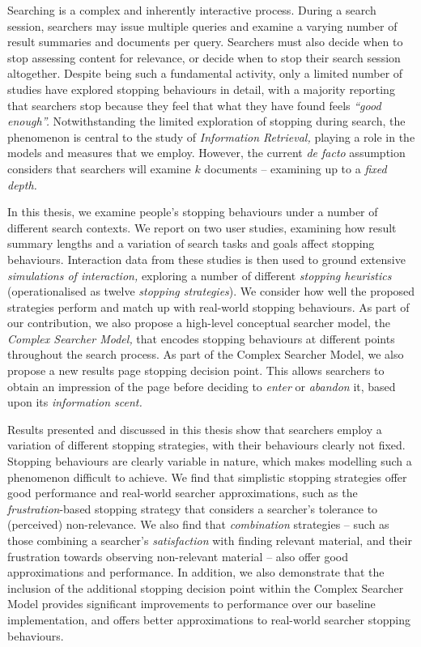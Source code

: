 
\begin{preamble}
{}

Searching is a complex and inherently interactive process. During a search session, searchers may issue multiple queries and examine a varying number of result summaries and documents per query. Searchers must also decide when to stop assessing content for relevance, or decide when to stop their search session altogether. Despite being such a fundamental activity, only a limited number of studies have explored stopping behaviours in detail, with a majority reporting that searchers stop because they feel that what they have found feels \emph{``good enough''.} Notwithstanding the limited exploration of stopping during search, the phenomenon is central to the study of \emph{Information Retrieval,} playing a role in the models and measures that we employ. However, the current \emph{de facto} assumption considers that searchers will examine $k$ documents -- examining up to a \emph{fixed depth.}

In this thesis, we examine people's stopping behaviours under a number of different search contexts. We report on two user studies, examining how result summary lengths and a variation of search tasks and goals affect stopping behaviours. Interaction data from these studies is then used to ground extensive \emph{simulations of interaction,}  exploring a number of different \emph{stopping heuristics} (operationalised as twelve \emph{stopping strategies}). We consider how well the proposed strategies perform and match up with real-world stopping behaviours. As part of our contribution, we also propose a high-level conceptual searcher model, the \emph{Complex Searcher Model,} that encodes stopping behaviours at different points throughout the search process. As part of the Complex Searcher Model, we also propose a new results page stopping decision point. This allows searchers to obtain an impression of the page before deciding to \emph{enter} or \emph{abandon} it, based upon its \emph{information scent.}

Results presented and discussed in this thesis show that searchers employ a variation of different stopping strategies, with their behaviours clearly not fixed. Stopping behaviours are clearly variable in nature, which makes modelling such a phenomenon difficult to achieve. We find that simplistic stopping strategies offer good performance and real-world searcher approximations, such as the \emph{frustration}-based stopping strategy that considers a searcher's tolerance to (perceived) non-relevance. We also find that \emph{combination} strategies -- such as those combining a searcher's \emph{satisfaction} with finding relevant material, and their frustration towards observing non-relevant material -- also offer good approximations and performance. In addition, we also demonstrate that the inclusion of the additional stopping decision point within the Complex Searcher Model provides significant improvements to performance over our baseline implementation, and offers better approximations to real-world searcher stopping behaviours.


\end{preamble}
